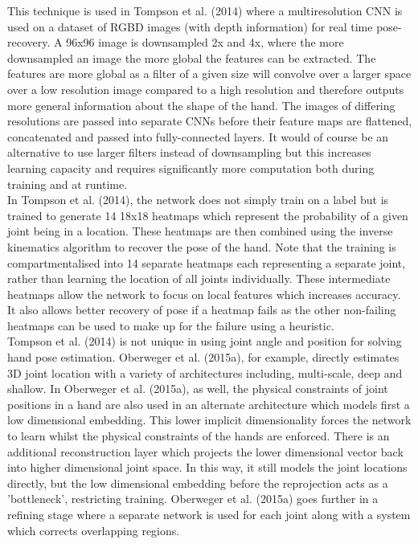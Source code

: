 \documentclass{article}
\begin{document}
This technique is used in Tompson et al. (2014) where a multiresolution CNN is used on a dataset of RGBD images (with depth information) for real time pose-recovery. A 96x96 image is downsampled 2x and 4x, where the more downsampled an image the more global the features can be extracted. The features are more global as a filter of a given size will convolve over a larger space over a low resolution image compared to a high resolution and therefore outputs more general information about the shape of the hand. The images of differing resolutions are passed into separate CNNs before their feature maps are flattened, concatenated and passed into fully-connected layers. It would of course be an alternative to use larger filters instead of downsampling but this increases learning capacity and requires significantly more computation both during training and at runtime.\\

In Tompson et al. (2014), the network does not simply train on a label but is trained to generate 14 18x18 heatmaps which represent the probability of a given joint being in a location. These heatmaps are then combined using the inverse kinematics algorithm to recover the pose of the hand. Note that the training is compartmentalised into 14 separate heatmaps each representing a separate joint, rather than learning the location of all joints individually. These intermediate heatmaps allow the network to focus on local features which increases accuracy. It also allows better recovery of pose if a heatmap fails as the other non-failing heatmaps can be used to make up for the failure using a heuristic.\\

Tompson et al. (2014) is not unique in using joint angle and position for solving hand pose estimation. Oberweger et al. (2015a), for example, directly estimates 3D joint location with a variety of architectures including, multi-scale, deep and shallow. In Oberweger et al. (2015a), as well, the physical constraints of joint positions in a hand are also used in an alternate architecture which models first a low dimensional embedding. This lower implicit dimensionality forces the network to learn whilst the physical constraints of the hands are enforced. There is an additional reconstruction layer which projects the lower dimensional vector back into higher dimensional joint space. In this way, it still models the joint locations directly, but the low dimensional embedding before the reprojection acts as a 'bottleneck', restricting training. Oberweger et al. (2015a) goes further in a refining stage where a separate network is used for each joint along with a system which corrects overlapping regions.\\
\end{document}
